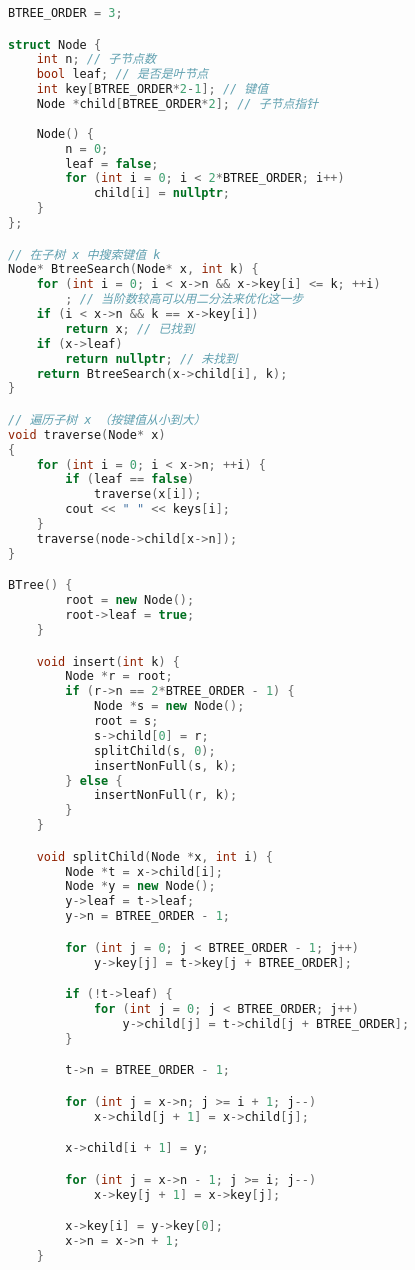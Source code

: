 \begin{lstlisting}[language=cpp,caption=Btree.h]
BTREE_ORDER = 3;

struct Node {
    int n; // 子节点数
    bool leaf; // 是否是叶节点
    int key[BTREE_ORDER*2-1]; // 键值
    Node *child[BTREE_ORDER*2]; // 子节点指针
    
    Node() {
        n = 0;
        leaf = false;
        for (int i = 0; i < 2*BTREE_ORDER; i++)
            child[i] = nullptr;
    }
};

// 在子树 x 中搜索键值 k
Node* BtreeSearch(Node* x, int k) {
    for (int i = 0; i < x->n && x->key[i] <= k; ++i)
        ; // 当阶数较高可以用二分法来优化这一步
    if (i < x->n && k == x->key[i])
        return x; // 已找到
    if (x->leaf)
        return nullptr; // 未找到
    return BtreeSearch(x->child[i], k);
}

// 遍历子树 x （按键值从小到大）
void traverse(Node* x)
{
    for (int i = 0; i < x->n; ++i) {
        if (leaf == false)
            traverse(x[i]);
        cout << " " << keys[i];
    }
    traverse(node->child[x->n]);
}

BTree() {
        root = new Node();
        root->leaf = true;
    }

    void insert(int k) {
        Node *r = root;
        if (r->n == 2*BTREE_ORDER - 1) {
            Node *s = new Node();
            root = s;
            s->child[0] = r;
            splitChild(s, 0);
            insertNonFull(s, k);
        } else {
            insertNonFull(r, k);
        }
    }

    void splitChild(Node *x, int i) {
        Node *t = x->child[i];
        Node *y = new Node();
        y->leaf = t->leaf;
        y->n = BTREE_ORDER - 1;

        for (int j = 0; j < BTREE_ORDER - 1; j++)
            y->key[j] = t->key[j + BTREE_ORDER];

        if (!t->leaf) {
            for (int j = 0; j < BTREE_ORDER; j++)
                y->child[j] = t->child[j + BTREE_ORDER];
        }

        t->n = BTREE_ORDER - 1;

        for (int j = x->n; j >= i + 1; j--)
            x->child[j + 1] = x->child[j];

        x->child[i + 1] = y;

        for (int j = x->n - 1; j >= i; j--)
            x->key[j + 1] = x->key[j];

        x->key[i] = y->key[0];
        x->n = x->n + 1;
    }


\end{lstlisting}

